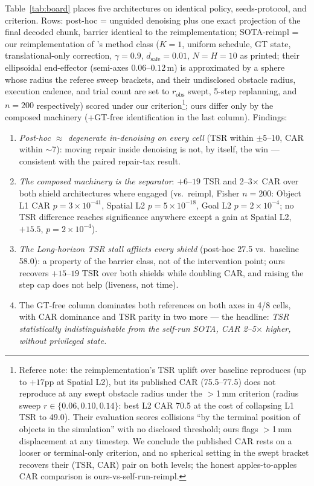 \documentclass[conference]{IEEEtran}
\begin{document}
Table~\ref{tab:board} places five architectures on identical policy, seeds-protocol, and criterion. Rows: post-hoc = unguided denoising plus one exact projection of the final decoded chunk, barrier identical to the reimplementation; SOTA-reimpl = our reimplementation of \cite{sota2607}'s method class ($K{=}1$, uniform schedule, GT state, translational-only correction, $\gamma{=}0.9$, $d_\text{safe}{=}0.01$, $N{=}H{=}10$ as printed; their ellipsoidal end-effector (semi-axes $0.06$--$0.12$\,m) is approximated by a sphere whose radius the referee sweep brackets, and their undisclosed obstacle radius, execution cadence, and trial count are set to $r_\text{obs}$ swept, 5-step replanning, and $n{=}200$ respectively) scored under our criterion\footnote{Referee note: the reimplementation's TSR uplift over baseline reproduces (up to $+17$pp at Spatial L2), but its published CAR (75.5--77.5) does not reproduce at any swept obstacle radius under the $>$1\,mm criterion (radius sweep $r\in\{0.06,0.10,0.14\}$: best L2 CAR 70.5 at the cost of collapsing L1 TSR to 49.0). Their evaluation scores collisions ``by the terminal position of objects in the simulation'' with no disclosed threshold; ours flags $>$1\,mm displacement at any timestep. We conclude the published CAR rests on a looser or terminal-only criterion, and no spherical setting in the swept bracket recovers their (TSR, CAR) pair on both levels; the honest apples-to-apples CAR comparison is ours-vs-self-run-reimpl.}; ours differ only by the composed machinery (+GT-free identification in the last column). Findings:
\begin{enumerate}
\item \emph{Post-hoc $\approx$ degenerate in-denoising on every cell} (TSR within $\pm$5--10, CAR within $\sim$7): moving repair inside denoising is not, by itself, the win --- consistent with the paired repair-tax result.
\item \emph{The composed machinery is the separator}: $+6$--$19$ TSR and 2--3$\times$ CAR over both shield architectures where engaged (vs.\ reimpl, Fisher $n{=}200$: Object L1 CAR $p=3\times10^{-41}$, Spatial L2 $p=5\times10^{-18}$, Goal L2 $p=2\times10^{-4}$; no TSR difference reaches significance anywhere except a gain at Spatial L2, $+15.5$, $p=2\times10^{-4}$).
\item \emph{The Long-horizon TSR stall afflicts every shield} (post-hoc 27.5 vs.\ baseline 58.0): a property of the barrier class, not of the intervention point; ours recovers $+15$--$19$ TSR over both shields while doubling CAR, and raising the step cap does not help (liveness, not time).
\item The GT-free column dominates both references on both axes in 4/8 cells, with CAR dominance and TSR parity in two more --- the headline: \emph{TSR statistically indistinguishable from the self-run SOTA, CAR 2--5$\times$ higher, without privileged state.}
\end{enumerate}
\end{document}
